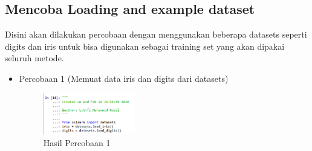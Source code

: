 \subsection{Mencoba Loading and example dataset}
Disini akan dilakukan percobaan dengan menggunakan beberapa datasets seperti digits dan iris untuk bisa digunakan sebagai training set yang akan dipakai seluruh metode.
\begin{itemize}
	\item Percobaan 1 (Memuat data iris dan digits dari datasets) \hfill \break 
	\begin{figure}[H]
		\includegraphics[width=4cm]{figures/1174035/chapter1/2_1_hasil.png}
		\centering
		\caption{Hasil Percobaan 1}
		

\end{figure}
\end{itemize}
